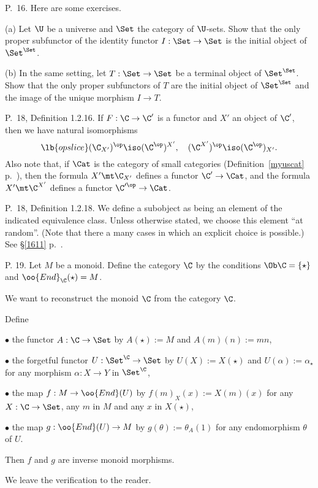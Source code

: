 \documentclass[12pt]{article}
\theoremstyle{remark}
\theoremstyle{definition}
\begin{document}
%

\begin{s}%
P.~16. Here are some exercises. 

\nn(a) Let $\U$ be a universe and $\Set$ the category of $\U$-sets. Show that the only proper subfunctor of the identity functor $I:\Set\to\Set$ is the initial object of $\Set^{\Set}$.

\nn(b) In the same setting, let $T:\Set\to\Set$ be a terminal object of $\Set^{\Set}$. Show that the only proper subfunctors of $T$ are the initial object of $\Set^{\Set}$ and the image of the unique morphism $I\to T$.%
\end{s}

%

\begin{s}
P.~18, Definition 1.2.16. If $F:\C\to\C'$ is a functor and $X'$ an object of $\C'$, then we have natural isomorphisms 
\begin{equation}\lb{opslice}
(\C_{X'})^{\op}\iso(\C^{\op})^{X'},\quad(\C^{X'})^{\op}\iso(\C^{\op})_{X'}.
\end{equation} 
Also note that, if $\Cat$ is the category of small categories (Definition~\ref{myuscat} p.~), then the formula $X'\mt\C_{X'}$ defines a functor $\C'\to\Cat$, and the formula $X'\mt\C^{X'}$ defines a functor $\C'^{\op}\to\Cat$.
\end{s}

%

\begin{s}
P.~18, Definition 1.2.18. We define a subobject as being an element of the indicated equivalence class. Unless otherwise stated, we choose this element ``at random''. (Note that there a many cases in which an explicit choice is possible.) See \S\ref{1611} p.~\pageref{1611}.
\end{s}

%

\begin{s}%
P. 19. Let $M$ be a monoid. Define the category $\C$ by the conditions $\Ob\C=\{\star\}$ and $\oo{End}_\C(\star)=M$.

We want to reconstruct the monoid $\C$ from the category $\C$.

Define 

\nn$\bullet$ the functor $A:\C\to\Set$ by $A(\star):=M$ and $A(m)(n):=mn$, 

\nn$\bullet$ the forgetful functor $U:\Set^\C\to\Set$ by $U(X):=X(\star)$ and $U(\alpha):=\alpha_\star$ for any morphism $\alpha:X\to Y$ in $\Set^\C$,

\nn$\bullet$ the map $f:M\to\oo{End}(U)$ by $f(m)_X(x):=X(m)(x)$ for any $X:\C\to\Set$, any $m$ in $M$ and any $x$ in $X(\star)$,

\nn$\bullet$ the map $g:\oo{End}(U)\to M$ by $g(\theta):=\theta_A(1)$ for any endomorphism $\theta$ of $U$.

Then $f$ and $g$ are inverse monoid morphisms.

We leave the verification to the reader.
\end{s}
\end{document}

